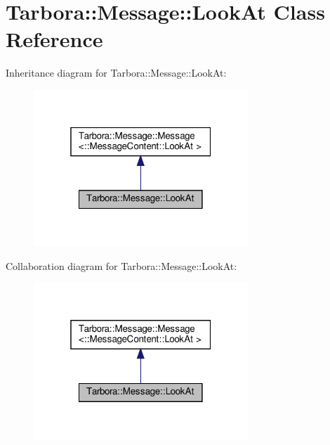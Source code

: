 \hypertarget{classTarbora_1_1Message_1_1LookAt}{}\section{Tarbora\+:\+:Message\+:\+:Look\+At Class Reference}
\label{classTarbora_1_1Message_1_1LookAt}


Inheritance diagram for Tarbora\+:\+:Message\+:\+:Look\+At\+:
\nopagebreak
\begin{figure}[H]
\begin{center}
\leavevmode
\includegraphics[width=229pt]{classTarbora_1_1Message_1_1LookAt__inherit__graph}
\end{center}
\end{figure}


Collaboration diagram for Tarbora\+:\+:Message\+:\+:Look\+At\+:
\nopagebreak
\begin{figure}[H]
\begin{center}
\leavevmode
\includegraphics[width=229pt]{classTarbora_1_1Message_1_1LookAt__coll__graph}
\end{center}
\end{figure}
